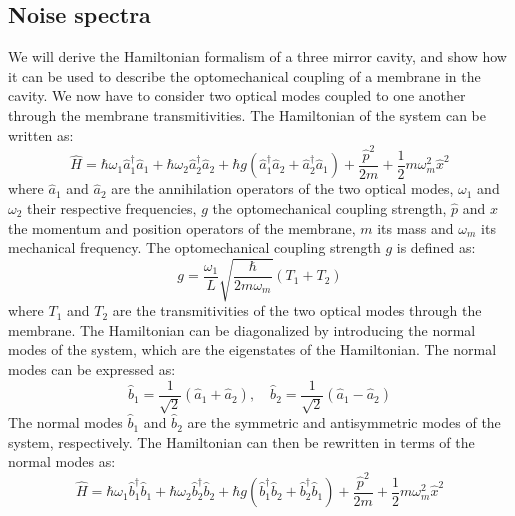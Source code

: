 \subsection{Noise spectra}
We will derive the Hamiltonian formalism of a three mirror cavity, and show how it can be used to describe the optomechanical coupling of a membrane in the cavity.
We now have to consider two optical modes coupled to one another through the membrane transmitivities. The Hamiltonian of the system can be written as:
\begin{equation}
\hat{H} = \hbar \omega_1 \hat{a}_1^\dagger \hat{a}_1 + \hbar \omega_2 \hat{a}_2^\dagger \hat{a}_2 + \hbar g(\hat{a}_1^\dagger \hat{a}_2 + \hat{a}_2^\dagger \hat{a}_1) + \frac{\hat{p}^2}{2m} + \frac{1}{2} m \omega_m^2 \hat{x}^2
\end{equation}
where $\hat{a}_1$ and $\hat{a}_2$ are the annihilation operators of the two optical modes, $\omega_1$ and $\omega_2$ their respective frequencies, $g$ the optomechanical coupling strength, $\hat{p}$ and $\hat{x}$ the momentum and position operators of the membrane, $m$ its mass and $\omega_m$ its mechanical frequency. The optomechanical coupling strength $g$ is defined as:
\begin{equation}
g = \frac{\omega_1}{L} \sqrt{\frac{\hbar}{2 m \omega_m}} \left( T_1 + T_2 \right)
\end{equation}
where $T_1$ and $T_2$ are the transmitivities of the two optical modes through the membrane. The Hamiltonian can be diagonalized by introducing the normal modes of the system, which are the eigenstates of the Hamiltonian. The normal modes can be expressed as:
\begin{equation}
\hat{b}_1 = \frac{1}{\sqrt{2}} \left( \hat{a}_1 + \hat{a}_2 \right), \quad \hat{b}_2 = \frac{1}{\sqrt{2}} \left( \hat{a}_1 - \hat{a}_2 \right)
\end{equation}
The normal modes $\hat{b}_1$ and $\hat{b}_2$ are the symmetric and antisymmetric modes of the system, respectively. The Hamiltonian can then be rewritten in terms of the normal modes as:
\begin{equation}
\hat{H} = \hbar \omega_1 \hat{b}_1
^\dagger \hat{b}_1 + \hbar \omega_2 \hat{b}_2^\dagger \hat{b}_2 + \hbar g(\hat{b}_1^\dagger \hat{b}_2 + \hat{b}_2^\dagger \hat{b}_1) + \frac{\hat{p}^2}{2m} + \frac{1}{2} m \omega_m^2 \hat{x}^2
\end{equation}


